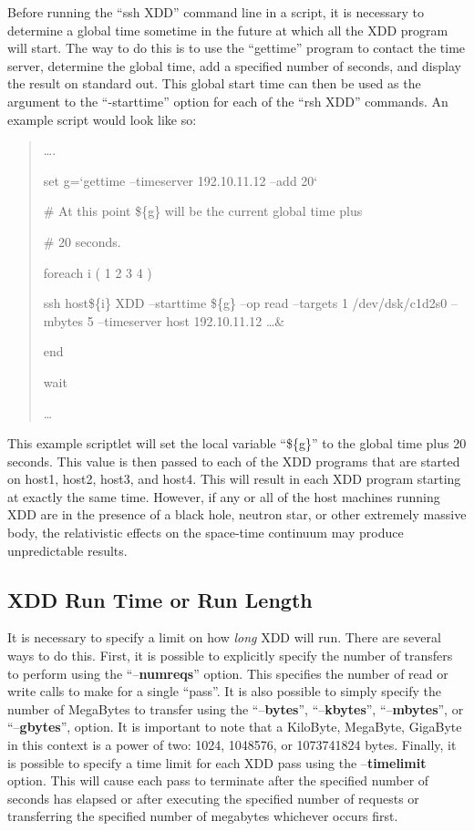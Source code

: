 Before running the ``ssh XDD'' command line in a script, it is necessary to determine a global time sometime in the future at which all the XDD program will start. The way to do this is to use the ``gettime'' program to contact the time server, determine the global time, add a specified number of seconds, and display the result on standard out. This global start time can then be used as the argument to the ``-starttime'' option for each of the ``rsh XDD'' commands. An example script would look like so:

\begin{quote}
\ldots.

set g=`gettime --timeserver 192.10.11.12 --add 20`

\# At this point \$\{g\} will be the current global time plus

\# 20 seconds.

foreach i ( 1 2 3 4 )

ssh host\$\{i\} XDD --starttime \$\{g\} --op read --targets 1 /dev/dsk/c1d2s0 --mbytes 5 --timeserver host 192.10.11.12 \ldots\&

end

wait

\ldots{}
\end{quote}

This example scriptlet will set the local variable ``\$\{g\}'' to the global time plus 20 seconds. This value is then passed to each of the XDD programs that are started on host1, host2, host3, and host4. This will result in each XDD program starting at exactly the same time. However, if any or all of the host machines running XDD are in the presence of a black hole, neutron star, or other extremely massive body, the relativistic effects on the space-time continuum may produce unpredictable results.

\subsection{XDD Run Time or Run Length}\label{xdd-run-time-or-run-length}

It is necessary to specify a limit on how \emph{long} XDD will run. There are several ways to do this. First, it is possible to explicitly specify the number of transfers to perform using the ``--\textbf{numreqs}'' option. This specifies the number of read or write calls to make for a single ``pass''. It is also possible to simply specify the number of MegaBytes to transfer using the ``--\textbf{bytes}'', ``--\textbf{kbytes}'', ``--\textbf{mbytes}'', or ``--\textbf{gbytes}'', option. It is important to note that a KiloByte, MegaByte, GigaByte in this context is a power of two: 1024, 1048576, or 1073741824 bytes. Finally, it is possible to specify a time limit for each XDD pass using the --\textbf{timelimit} option. This will cause each pass to terminate after the specified number of seconds has elapsed or after executing the specified number of requests or transferring the specified number of megabytes whichever occurs first.

